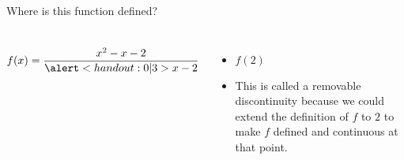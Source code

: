 \begin{frame}
\begin{example} %
Where is this function defined?
\begin{columns}[c]
\[
f(x) = \frac{x^2 - x - 2}{\alert<handout:0 |3>{x - 2}}
\]
\ 
\begin{itemize}
\item<2-| alert@2-3>  $f(2)$ 
\item<4->  This is called a removable discontinuity because we could extend the definition of $f$ to $2$ to make $f$ defined and continuous at that point.
\end{itemize}
\end{columns}
\end{example}
\end{frame}


